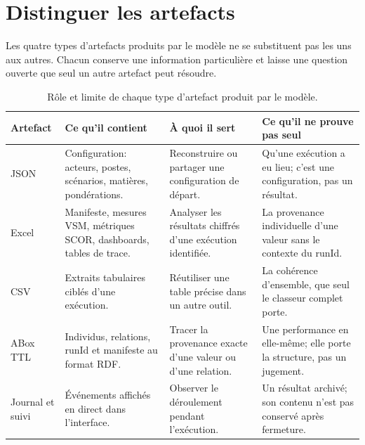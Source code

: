 \section{Distinguer les artefacts}

Les quatre types d'artefacts produits par le modèle ne se substituent pas les uns aux autres. Chacun conserve une information particulière et laisse une question ouverte que seul un autre artefact peut résoudre.

\begin{table}[H]
  \centering
  \small
  \begin{tabularx}{\textwidth}{L{0.14\textwidth} Y Y Y}
    \toprule
    Artefact & Ce qu'il contient & À quoi il sert & Ce qu'il ne prouve pas seul \\
    \midrule
    JSON & Configuration: acteurs, postes, scénarios, matières, pondérations. & Reconstruire ou partager une configuration de départ. & Qu'une exécution a eu lieu; c'est une configuration, pas un résultat. \\
    Excel & Manifeste, mesures VSM, métriques SCOR, dashboards, tables de trace. & Analyser les résultats chiffrés d'une exécution identifiée. & La provenance individuelle d'une valeur sans le contexte du runId. \\
    CSV & Extraits tabulaires ciblés d'une exécution. & Réutiliser une table précise dans un autre outil. & La cohérence d'ensemble, que seul le classeur complet porte. \\
    ABox TTL & Individus, relations, runId et manifeste au format RDF. & Tracer la provenance exacte d'une valeur ou d'une relation. & Une performance en elle-même; elle porte la structure, pas un jugement. \\
    Journal et suivi & Événements affichés en direct dans l'interface. & Observer le déroulement pendant l'exécution. & Un résultat archivé; son contenu n'est pas conservé après fermeture. \\
    \bottomrule
  \end{tabularx}
  \caption{Rôle et limite de chaque type d'artefact produit par le modèle.}
  \label{tab:artefacts-preuves}
\end{table}



